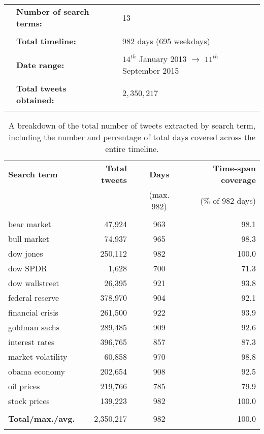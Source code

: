 \documentclass{article}
\begin{document}
\vspace{3mm}


\begin{center}
\begin{tabular}{llll}
 & \textbf{Number of search terms:} &  & 13\\
 &  &  & \\
 & \textbf{Total timeline:} &  & 982 days (695 weekdays)\\
 &  &  & \\
 & \textbf{Date range:} &  & $14^{th}$ January 2013 $\rightarrow$ $11^{th}$ September 2015\footnotemark\\
 &  &  & \\
 & \textbf{Total tweets obtained:} &  & $2,350,217$\\
 &  &  & \\
\end{tabular}
\end{center}


\vspace{3mm}

\begin{table}[htb]
\centering
\begin{tabular}{lrlclr}
\textbf{Search term} & \textbf{Total tweets} &  & \textbf{Days} &  & \textbf{Time-span coverage}\\
 &  &  & (max. 982) &  & (\% of 982 days)\\
\hline
 &  &  &  &  & \\
bear market & 47,924 &  & 963 &  & 98.1\\
bull market & 74,937 &  & 965 &  & 98.3\\
dow jones & 250,112 &  & 982 &  & 100.0\\
dow SPDR & 1,628 &  & 700 &  & 71.3\\
dow wallstreet & 26,395 &  & 921 &  & 93.8\\
federal reserve & 378,970 &  & 904 &  & 92.1\\
financial crisis & 261,500 &  & 922 &  & 93.9\\
goldman sachs & 289,485 &  & 909 &  & 92.6\\
interest rates & 396,765 &  & 857 &  & 87.3\\
market volatility & 60,858 &  & 970 &  & 98.8\\
obama economy & 202,654 &  & 908 &  & 92.5\\
oil prices & 219,766 &  & 785 &  & 79.9\\
stock prices & 139,223 &  & 982 &  & 100.0\\
 &  &  &  &  & \\
\textbf{Total/max./avg.} & 2,350,217 &  & 982 &  & 100.0\\
 &  &  &  &  & \\
\end{tabular}\caption{\label{tab.tweet-breakdown}A breakdown of the total number of tweets extracted by search term, including the number and percentage of total days covered across the entire timeline.}

\end{table}
\end{document}
